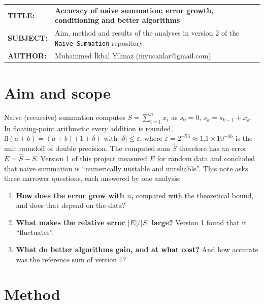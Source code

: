 \documentclass[11pt,a4paper]{article}
\begin{document}
\vspace*{14pt}
\begin{tabular}{@{}p{2.35cm}@{}p{\dimexpr\textwidth-2.35cm}@{}}
\textbf{TITLE:} & \textbf{\large Accuracy of naive summation: error growth, conditioning and better algorithms}\\[3pt]
\textbf{SUBJECT:} & Aim, method and results of the analyses in version 2 of the \texttt{Naive-Summation} repository\\[3pt]
\textbf{AUTHOR:} & Muhammed İkbal Yılmaz (myucanlar@gmail.com)
\end{tabular}

\vspace{8pt}
\vspace{12pt}

\section{Aim and scope}

Naive (recursive) summation computes $S = \sum_{i=1}^{n} x_i$ as $s_0 = 0$, $s_k = s_{k-1} + x_k$. In floating-point
arithmetic every addition is rounded, $\mathrm{fl}(a+b) = (a+b)(1+\delta)$ with $|\delta| \le \varepsilon$, where
$\varepsilon = 2^{-53} \approx 1.1\times10^{-16}$ is the unit roundoff of double precision. The computed sum
$\hat S$ therefore has an error $E = \hat S - S$. Version 1 of this project measured $E$ for random data and concluded that
naive summation is ``numerically unstable and unreliable''. This note asks three narrower questions, each answered by one
analysis:

\begin{enumerate}
  \item \textbf{How does the error grow with $n$,} compared with the theoretical bound, and does that depend on the data?
  \item \textbf{What makes the relative error $|E|/|S|$ large?} Version 1 found that it ``fluctuates''.
  \item \textbf{What do better algorithms gain, and at what cost?} And how accurate was the reference sum of version 1?
\end{enumerate}

\section{Method}
\end{document}
